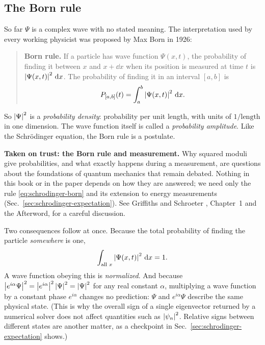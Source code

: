 \subsection{The Born rule}

So far $\Psi$ is a complex wave with no stated meaning. The interpretation used by every working physicist was proposed by Max Born in 1926:

\begin{quote}
\textbf{Born rule.} If a particle has wave function $\Psi(x,t)$, the probability of finding it between $x$ and $x+\dd x$ when its position is measured at time $t$ is $\left\lvert \Psi(x,t)\right\rvert^2\,\mathrm{d} x$. The probability of finding it in an interval $[a,b]$ is
\begin{equation}
P_{[a,b]}(t)=\int_a^b\left\lvert \Psi(x,t)\right\rvert^2\,\mathrm{d} x.
\label{eq:schrodinger-born}
\end{equation}
\end{quote}

So $\left\lvert \Psi\right\rvert^2$ is a \emph{probability density}: probability per unit length, with units of $1/\text{length}$ in one dimension. The wave function itself is called a \emph{probability amplitude}. Like the Schr\"odinger equation, the Born rule is a postulate.

\begin{beyond}
\textbf{Taken on trust: the Born rule and measurement.} Why squared moduli give probabilities, and what exactly happens during a measurement, are questions about the foundations of quantum mechanics that remain debated. Nothing in this book or in the paper depends on how they are answered; we need only the rule \eqref{eq:schrodinger-born} and its extension to energy measurements (Sec.~\ref{sec:schrodinger-expectation}). See Griffiths and Schroeter \cite{griffiths}, Chapter~1 and the Afterword, for a careful discussion.
\end{beyond}

Two consequences follow at once. Because the total probability of finding the particle \emph{somewhere} is one,
\begin{equation}
\int_{\text{all }x}\left\lvert \Psi(x,t)\right\rvert^2\,\mathrm{d} x=1.
\label{eq:schrodinger-norm}
\end{equation}
A wave function obeying this is \emph{normalized}. And because $\left\lvert e^{i\alpha}\Psi\right\rvert^2=\left\lvert e^{i\alpha}\right\rvert^2\left\lvert \Psi\right\rvert^2=\left\lvert \Psi\right\rvert^2$ for any real constant $\alpha$, multiplying a wave function by a constant phase $e^{i\alpha}$ changes no prediction: $\Psi$ and $e^{i\alpha}\Psi$ describe the same physical state. (This is why the overall sign of a single eigenvector returned by a numerical solver does not affect quantities such as $\left\lvert \psi_n\right\rvert^2$. Relative signs between different states are another matter, as a checkpoint in Sec.~\ref{sec:schrodinger-expectation} shows.)

